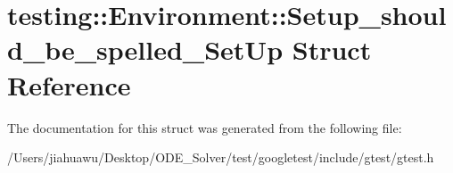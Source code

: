 \hypertarget{structtesting_1_1_environment_1_1_setup__should__be__spelled___set_up}{}\section{testing\+:\+:Environment\+:\+:Setup\+\_\+should\+\_\+be\+\_\+spelled\+\_\+\+Set\+Up Struct Reference}
\label{structtesting_1_1_environment_1_1_setup__should__be__spelled___set_up}


The documentation for this struct was generated from the following file\+:\begin{DoxyCompactItemize}
\item 
/\+Users/jiahuawu/\+Desktop/\+O\+D\+E\+\_\+\+Solver/test/googletest/include/gtest/gtest.\+h\end{DoxyCompactItemize}
